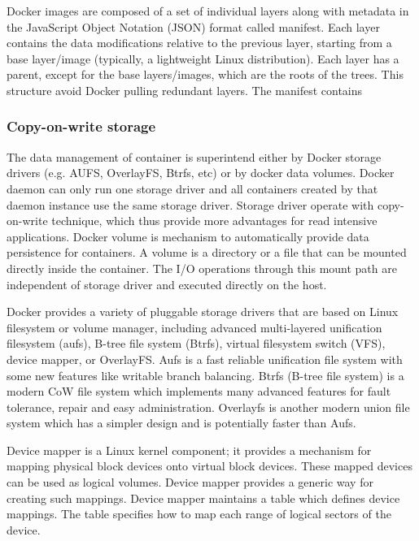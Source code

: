 Docker images are composed of a set of individual layers along with metadata in the JavaScript Object Notation (JSON) format called manifest. Each layer contains the data modifications relative to the previous layer, starting from a base layer/image (typically, a lightweight Linux distribution). Each layer has a parent, except for the base layers/images, which are the roots of the trees. This structure avoid Docker pulling redundant layers. The manifest contains


\subsubsection{Copy-on-write storage}


The data management of container is superintend either by Docker storage drivers (e.g. AUFS, OverlayFS, Btrfs, etc) or by docker data volumes. Docker daemon can only run one storage driver and all containers created by that daemon instance use the same storage driver. Storage driver operate with copy-on-write technique, which thus provide more advantages for read intensive applications. Docker volume is mechanism to automatically provide data persistence for containers. A volume is a directory or a file that can be mounted directly inside the container. The I/O operations through this mount path are independent of storage driver and executed directly on the host. 

Docker provides a variety of pluggable storage drivers that are based on Linux filesystem or volume manager, including advanced multi-layered unification filesystem (aufs), B-tree file system (Btrfs), virtual filesystem switch (VFS), device mapper, or OverlayFS. Aufs is a fast reliable unification file system with some new features like writable branch balancing. Btrfs
(B-tree file system) is a modern CoW file system which implements many advanced features for fault tolerance, repair
and easy administration. Overlayfs is another modern union file system which has a simpler design and is potentially faster
than Aufs.

Device mapper is a Linux kernel component; it provides a mechanism for mapping physical block devices onto virtual block devices. These mapped devices can be used as logical volumes. Device mapper provides a generic way for creating such mappings. Device mapper maintains a table which defines device mappings. The table specifies how to map each range of logical sectors of the device.

